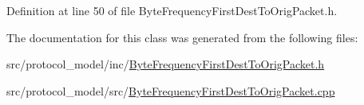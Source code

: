 Definition at line 50 of file Byte\-Frequency\-First\-Dest\-To\-Orig\-Packet.\-h.



The documentation for this class was generated from the following files\-:\begin{DoxyCompactItemize}
\item 
src/protocol\-\_\-model/inc/\hyperlink{_byte_frequency_first_dest_to_orig_packet_8h}{Byte\-Frequency\-First\-Dest\-To\-Orig\-Packet.\-h}\item 
src/protocol\-\_\-model/src/\hyperlink{_byte_frequency_first_dest_to_orig_packet_8cpp}{Byte\-Frequency\-First\-Dest\-To\-Orig\-Packet.\-cpp}\end{DoxyCompactItemize}
